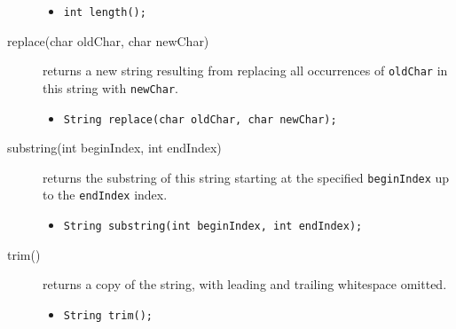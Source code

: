 \documentclass[11pt,a4paper]{article}
\begin{document}
\begin{description}
\begin{itemize}
\item \lstinline!int length();!
\end{itemize}
\item [replace(char oldChar, char newChar)] returns a new string resulting from replacing all occurrences of \texttt{oldChar} in this string with \texttt{newChar}.

\begin{itemize}
\item \lstinline!String replace(char oldChar, char newChar);!
\end{itemize}
\item [substring(int beginIndex, int endIndex)] returns the substring of this string starting at the specified \texttt{beginIndex} up to the \texttt{endIndex} index.

\begin{itemize}
\item \lstinline!String substring(int beginIndex, int endIndex);!
\end{itemize}
\item [trim()] returns a copy of the string, with leading and trailing whitespace omitted.

\begin{itemize}
\item \lstinline!String trim();!
\end{itemize}



\end{description}
\vfill{\ }
\end{document}
